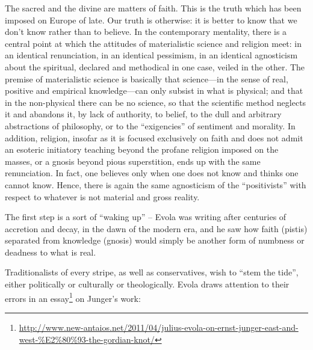 \begin{quotex}
The sacred and the divine are matters of faith. This is the truth which has been imposed on Europe of late. Our truth is otherwise: it is better to know that we don't know rather than to believe. In the contemporary mentality, there is a central point at which the attitudes of materialistic science and religion meet: in an identical renunciation, in an identical pessimism, in an identical agnosticism about the spiritual, declared and methodical in one case, veiled in the other. The premise of materialistic science is basically that science---in the sense of real, positive and empirical knowledge---can only subsist in what is physical; and that in the non-physical there can be no science, so that the scientific method neglects it and abandons it, by lack of authority, to belief, to the dull and arbitrary abstractions of philosophy, or to the ``exigencies'' of sentiment and morality. In addition, religion, insofar as it is focused exclusively on faith and does not admit an esoteric initiatory teaching beyond the profane religion imposed on the masses, or a gnosis beyond pious superstition, ends up with the same renunciation. In fact, one believes only when one does not know and thinks one cannot know. Hence, there is again the same agnosticism of the ``positivists'' with respect to whatever is not material and gross reality.
\end{quotex}

The first step is a sort of ``waking up'' -- Evola was writing after centuries of accretion and decay, in the dawn of the modern era, and he saw how faith (pistis) separated from knowledge (gnosis) would simply be another form of numbness or deadness to what is real.

Traditionalists of every stripe, as well as conservatives, wish to ``stem the tide'', either politically or culturally or theologically. Evola draws attention to their errors in an essay\footnote{\url{http://www.new-antaios.net/2011/04/julius-evola-on-ernst-junger-east-and-west-\%E2\%80\%93-the-gordian-knot/}} on Junger's work:

